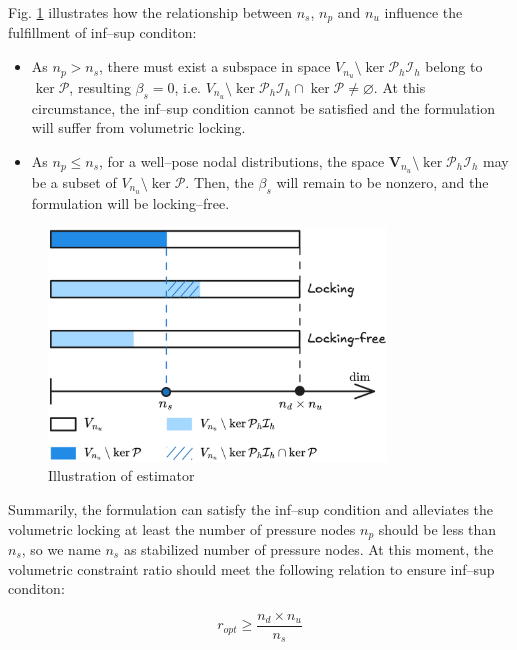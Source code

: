 Fig. \ref{fg:space} illustrates how the relationship between $n_s$, $n_p$ and $n_u$ influence the fulfillment of inf--sup conditon:
\begin{itemize}
    \item As $n_p > n_s$, there must exist a subspace in space $V_{n_u} \setminus \ker \mathcal P_h \mathcal I_h$ belong to $\ker \mathcal P$, resulting $\beta_s = 0$, i.e. $V_{n_u}\setminus \ker \mathcal P_h \mathcal I_h \cap \ker \mathcal P \neq \varnothing$. At this circumstance, the inf--sup condition cannot be satisfied and the formulation will suffer from volumetric locking.

    \item As $n_p \le n_s$, for a well--pose nodal distributions, the space $\boldsymbol V_{n_u} \setminus \ker \mathcal P_h \mathcal I_h$ may be a subset of $V_{n_u} \setminus \ker \mathcal P$. Then, the $\beta_s$ will remain to be nonzero, and the formulation will be locking--free.
\end{itemize}

\begin{figure}[!ht]
    \centering
    \includegraphics[width=0.8\textwidth]{png/space.png}
    \caption{Illustration of estimator}\label{fg:space}
\end{figure}

Summarily, the formulation can satisfy the inf--sup condition and alleviates the volumetric locking at least the number of pressure nodes $n_p$ should be less than $n_s$, so we name $n_s$ as stabilized number of pressure nodes. At this moment, the volumetric constraint ratio should meet the following relation to ensure inf--sup conditon: 

\begin{equation}\label{optimal_ratio}
    r_{opt} \ge \frac{n_d\times n_u}{n_s} 
\end{equation}

